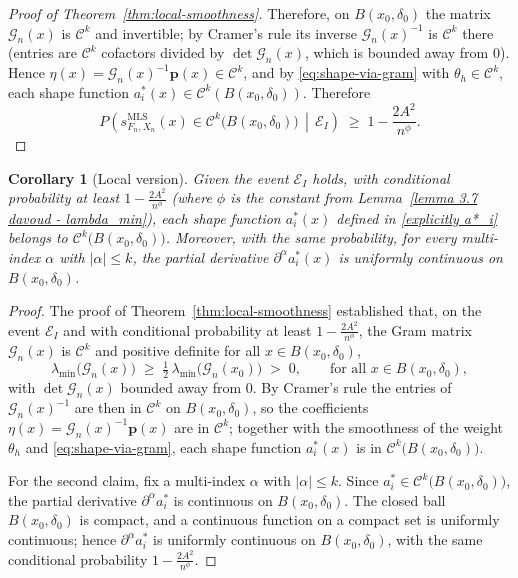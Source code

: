 \documentclass{article}
\newtheorem{coro}{Corollary}
\newcommand{\mlsfunstoch}{s^\text{MLS}_{F_n,X_n}}
\begin{document}
\begin{proof}[Proof of Theorem~\ref{thm:local-smoothness}]
Therefore, on $B(x_0,\delta_0)$ the matrix $\mathscr{G}_n(x)$ is $\mathcal{C}^k$ and invertible; by
Cramer's rule its inverse $\mathscr{G}_n(x)^{-1}$ is $\mathcal{C}^k$ there (entries are
$\mathcal{C}^k$ cofactors divided by $\det\mathscr{G}_n(x)$, which is bounded away from $0$).
Hence $\eta(x)=\mathscr{G}_n(x)^{-1}\boldsymbol{p}(x)\in\mathcal{C}^k$, and by
\eqref{eq:shape-via-gram} with $\theta_h\in\mathcal{C}^k$, each shape function
$a_i^*(x)\in\mathcal{C}^k(B(x_0,\delta_0))$. Therefore
$$
P\!\left(\mlsfunstoch(x)\in\mathcal{C}^k\big(B(x_0,\delta_0)\big)\,\middle|\,\mathscr{E}_I\right)
\;\ge\;1-\frac{2A^2}{n^{\phi}} .
$$
\end{proof}

\begin{coro}[Local version]\label{cor:local-shapefun}
Given the event $\mathscr{E}_I$ holds, with conditional probability at least
$1 - \tfrac{2A^2}{n^{\phi}}$ (where $\phi$ is the constant from
Lemma~\ref{lemma 3.7 davoud - lambda_min}), each shape function $a^*_i(x)$ defined in
\eqref{explicitly a*_i} belongs to $\mathcal{C}^k\!\big(B(x_0,\delta_0)\big)$. Moreover, with the
same probability, for every multi-index $\alpha$ with $|\alpha| \le k$, the partial derivative
$\partial^\alpha a^*_i(x)$ is uniformly continuous on $B(x_0,\delta_0)$.
\end{coro}

\begin{proof}
The proof of Theorem~\ref{thm:local-smoothness} established that, on the event $\mathscr{E}_I$ and
with conditional probability at least $1 - \tfrac{2A^2}{n^{\phi}}$, the Gram matrix
$\mathscr{G}_n(x)$ is $\mathcal{C}^k$ and positive definite for all $x \in B(x_0,\delta_0)$,
\begin{equation}\label{eq:lambdamin-ball}
  \lambda_{\min}\big(\mathscr{G}_n(x)\big) \;\ge\; \tfrac12\,\lambda_{\min}\big(\mathscr{G}_n(x_0)\big)
  \;>\;0, \qquad \text{for all } x \in B(x_0,\delta_0),
\end{equation}
with $\det\mathscr{G}_n(x)$ bounded away from $0$. By Cramer's rule the entries of
$\mathscr{G}_n(x)^{-1}$ are then in $\mathcal{C}^k$ on $B(x_0,\delta_0)$, so the coefficients
$\eta(x) = \mathscr{G}_n(x)^{-1}\boldsymbol{p}(x)$ are in $\mathcal{C}^k$; together with the smoothness
of the weight $\theta_h$ and \eqref{eq:shape-via-gram}, each shape function $a^*_i(x)$ is in
$\mathcal{C}^k\!\big(B(x_0,\delta_0)\big)$.

For the second claim, fix a multi-index $\alpha$ with $|\alpha| \le k$. Since
$a^*_i \in \mathcal{C}^k\!\big(B(x_0,\delta_0)\big)$, the partial derivative $\partial^\alpha a^*_i$
is continuous on $B(x_0,\delta_0)$. The closed ball ${B(x_0,\delta_0)}$ is compact, and a
continuous function on a compact set is uniformly continuous; hence $\partial^\alpha a^*_i$ is
uniformly continuous on $B(x_0,\delta_0)$, with the same conditional probability
$1 - \tfrac{2A^2}{n^{\phi}}$.
\end{proof}
\end{document}
